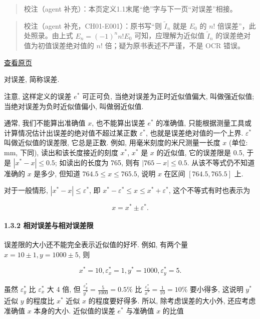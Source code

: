 \documentclass[
  10pt,
  fontset=fandol]{ctexart}
\begin{document}
\begin{quote}
校注（agent 补充）：本页定义1.1末尾``绝''字与下一页``对误差''相接。
\end{quote}

\begin{quote}
校注（agent 补充，CH01-E001）：原书写``则 \(\tilde{I}_n\) 就是 \(E_0\) 的 \(n!\) 倍误差''，此处照录。由上式 \(E_n=(-1)^n n!E_0\) 可知，应理解为近似值 \(\tilde{I}_n\) 的误差绝对值为初值误差绝对值的 \(n!\) 倍；疑为原书表述不严谨，不是 OCR 错误。
\end{quote}

\href{../../source-images/pdf-018.jpeg}{查看原页}

对误差, 简称误差.

注意, 这样定义的误差 \(e^*\) 可正可负, 当绝对误差为正时近似值偏大, 叫做强近似值; 当绝对误差为负时近似值偏小, 叫做弱近似值.

通常, 我们不能算出准确值 \(x\), 也不能算出误差 \(e^*\) 的准确值, 只能根据测量工具或计算情况估计出误差的绝对值不超过某正数 \(\varepsilon^*\), 也就是误差绝对值的一个上界. \(\varepsilon^*\) 叫做近似值的误差限, 它总是正数. 例如, 用毫米刻度的米尺测量一长度 \(x\) (单位: mm, 下同), 读出和该长度接近的刻度 \(x^*\), \(x^*\) 是 \(x\) 的近似值, 它的误差限是 0.5, 于是 \(|x^* - x| \leqslant 0.5\); 如读出的长度为 765, 则有 \(|765 - x| \leqslant 0.5\). 从该不等式仍不知道准确的 \(x\) 是多少, 但知道 \(764.5 \leqslant x \leqslant 765.5\), 说明 \(x\) 在区间 \([764.5, 765.5]\) 上.

对于一般情形, \(|x^* - x| \leqslant \varepsilon^*\), 即 \(x^* - \varepsilon^* \leqslant x \leqslant x^* + \varepsilon^*\), 这个不等式有时也表示为

\[
x = x^* \pm \varepsilon^*.
\]

\paragraph{1.3.2 相对误差与相对误差限}\label{ux76f8ux5bf9ux8befux5deeux4e0eux76f8ux5bf9ux8befux5deeux9650}

误差限的大小还不能完全表示近似值的好坏. 例如, 有两个量 \(x = 10 \pm 1, y = 1000 \pm 5\), 则

\[
x^* = 10, \varepsilon_x^* = 1, y^* = 1000, \varepsilon_y^* = 5.
\]

虽然 \(\varepsilon_y^*\) 比 \(\varepsilon_x^*\) 大 4 倍, 但 \(\frac{\varepsilon_y^*}{y^*} = \frac{5}{1000} = 0.5\%\) 比 \(\frac{\varepsilon_x^*}{x^*} = \frac{1}{10} = 10\%\) 要小得多, 这说明 \(y^*\) 近似 \(y\) 的程度比 \(x^*\) 近似 \(x\) 的程度要好得多. 所以, 除考虑误差的大小外, 还应考虑准确值 \(x\) 本身的大小. 近似值的误差 \(e^*\) 与准确值 \(x\) 的比值
\end{document}
